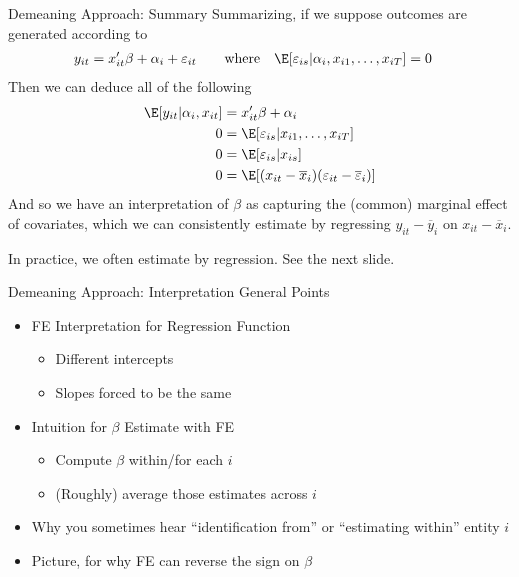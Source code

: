 \documentclass[aspectratio=169, handout]{beamer}
\begin{document}
{\footnotesize
\begin{frame}{Demeaning Approach: Summary}
Summarizing, if we suppose outcomes are generated according to
\begin{align*}
  y_{it}
  &=
  x_{it}'\beta
  + \alpha_i
  + \varepsilon_{it}
  \qquad\text{where}\quad
  \E[\varepsilon_{is}|\alpha_i,x_{i1},\ldots,x_{iT}]
  = 0
\end{align*}
Then we can deduce all of the following
\begin{align*}
  \E[y_{it}|\alpha_i,x_{it}]
  &=
  x_{it}'\beta + \alpha_i
  \\
  0 &= \E[\varepsilon_{is}|x_{i1},\ldots,x_{iT}]
  \\
  0
  &=
  \E[\varepsilon_{is}|x_{is}]
  \\
  0
  &=
  \E[
  (x_{it} - \overline{x}_i)
  (\varepsilon_{it}-\overline{\varepsilon}_i)
  ]
\end{align*}
And so we have an interpretation of $\beta$ as capturing the (common)
marginal effect of covariates, which we can consistently estimate by
regressing
$y_{it}-\overline{y}_i$
on
$x_{it}-\overline{x}_i$.

In practice, we often estimate by regression.
See the next slide.
\end{frame}
}


\begin{frame}[shrink]{Demeaning Approach: Interpretation}
General Points
\begin{itemize}
  \item FE Interpretation for Regression Function
    \begin{itemize}
      \item Different intercepts
      \item Slopes forced to be the same
    \end{itemize}
  \item Intuition for $\beta$ Estimate with FE
    \begin{itemize}
      \item Compute $\beta$ within/for each $i$
      \item (Roughly) average those estimates across $i$
    \end{itemize}
  \item Why you sometimes hear ``identification from'' or ``estimating
    within'' entity $i$
  \item Picture, for why FE can reverse the sign on $\beta$
\end{itemize}
\end{frame}
\end{document}
